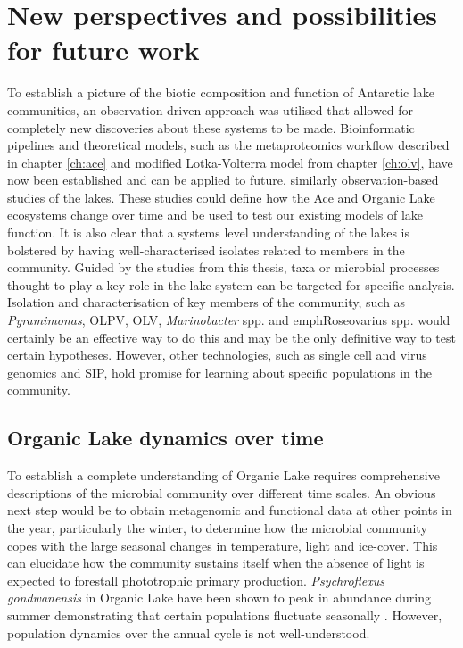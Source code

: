 \section{New perspectives and possibilities for future work}
To establish a picture of the biotic composition and function of Antarctic lake communities, an observation-driven approach was utilised that allowed for completely new discoveries about these systems to be made.
Bioinformatic pipelines and theoretical models, such as the metaproteomics workflow described in chapter \ref{ch:ace} and modified Lotka-Volterra model from chapter \ref{ch:olv}, have now been established and can be applied to future, similarly observation-based studies of the lakes.
These studies could define how the Ace and Organic Lake ecosystems change over time and be used to test our existing models of lake function.
It is also clear that a systems level understanding of the lakes is bolstered by having well-characterised isolates related to members in the community.
Guided by the studies from this thesis, taxa or microbial processes thought to play a key role in the lake system can be targeted for specific analysis.
Isolation and characterisation of key members of the community, such as \emph{Pyramimonas}, \ac{OLPV}, \ac{OLV}, \emph{Marinobacter} spp. and emph{Roseovarius} spp. would certainly be an effective way to do this and may be the only definitive way to test certain hypotheses.
However, other technologies, such as single cell and virus genomics and \ac{SIP}, hold promise for learning about specific populations in the community.

\subsection{Organic Lake dynamics over time}
To establish a complete understanding of Organic Lake requires comprehensive descriptions of the microbial community over different time scales.
An obvious next step would be to obtain metagenomic and functional data at other points in the year, particularly the winter, to determine how the microbial community copes with the large seasonal changes in temperature, light and ice-cover.
This can elucidate how the community sustains itself when the absence of light is expected to forestall phototrophic primary production.
\emph{Psychroflexus gondwanensis} in Organic Lake have been shown to peak in abundance during summer demonstrating that certain populations fluctuate seasonally \cite{James1994}.
However, population dynamics over the annual cycle is not well-understood.

